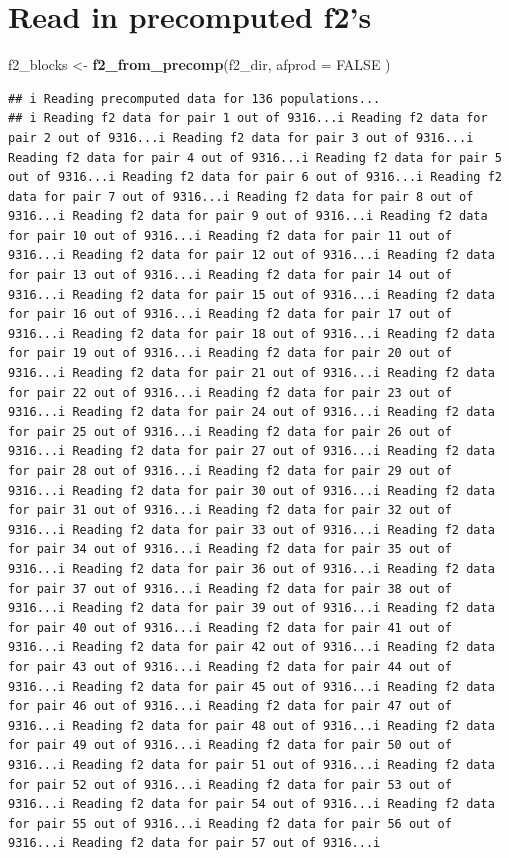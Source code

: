 \documentclass[
]{article}
\newenvironment{Shaded}{\begin{snugshade}}{\end{snugshade}}
\newcommand{\AttributeTok}[1]{\textcolor[rgb]{0.13,0.29,0.53}{#1}}
\newcommand{\ConstantTok}[1]{\textcolor[rgb]{0.56,0.35,0.01}{#1}}
\newcommand{\FunctionTok}[1]{\textcolor[rgb]{0.13,0.29,0.53}{\textbf{#1}}}
\newcommand{\NormalTok}[1]{#1}
\newcommand{\OtherTok}[1]{\textcolor[rgb]{0.56,0.35,0.01}{#1}}
\begin{document}
\section{Read in precomputed f2's}\label{read-in-precomputed-f2s}

\begin{Shaded}
\begin{Highlighting}[]
\NormalTok{f2\_blocks }\OtherTok{\textless{}{-}} \FunctionTok{f2\_from\_precomp}\NormalTok{(f2\_dir,}
  \AttributeTok{afprod =} \ConstantTok{FALSE}
\NormalTok{)}
\end{Highlighting}
\end{Shaded}

\begin{verbatim}
## i Reading precomputed data for 136 populations...
## i Reading f2 data for pair 1 out of 9316...i Reading f2 data for pair 2 out of 9316...i Reading f2 data for pair 3 out of 9316...i Reading f2 data for pair 4 out of 9316...i Reading f2 data for pair 5 out of 9316...i Reading f2 data for pair 6 out of 9316...i Reading f2 data for pair 7 out of 9316...i Reading f2 data for pair 8 out of 9316...i Reading f2 data for pair 9 out of 9316...i Reading f2 data for pair 10 out of 9316...i Reading f2 data for pair 11 out of 9316...i Reading f2 data for pair 12 out of 9316...i Reading f2 data for pair 13 out of 9316...i Reading f2 data for pair 14 out of 9316...i Reading f2 data for pair 15 out of 9316...i Reading f2 data for pair 16 out of 9316...i Reading f2 data for pair 17 out of 9316...i Reading f2 data for pair 18 out of 9316...i Reading f2 data for pair 19 out of 9316...i Reading f2 data for pair 20 out of 9316...i Reading f2 data for pair 21 out of 9316...i Reading f2 data for pair 22 out of 9316...i Reading f2 data for pair 23 out of 9316...i Reading f2 data for pair 24 out of 9316...i Reading f2 data for pair 25 out of 9316...i Reading f2 data for pair 26 out of 9316...i Reading f2 data for pair 27 out of 9316...i Reading f2 data for pair 28 out of 9316...i Reading f2 data for pair 29 out of 9316...i Reading f2 data for pair 30 out of 9316...i Reading f2 data for pair 31 out of 9316...i Reading f2 data for pair 32 out of 9316...i Reading f2 data for pair 33 out of 9316...i Reading f2 data for pair 34 out of 9316...i Reading f2 data for pair 35 out of 9316...i Reading f2 data for pair 36 out of 9316...i Reading f2 data for pair 37 out of 9316...i Reading f2 data for pair 38 out of 9316...i Reading f2 data for pair 39 out of 9316...i Reading f2 data for pair 40 out of 9316...i Reading f2 data for pair 41 out of 9316...i Reading f2 data for pair 42 out of 9316...i Reading f2 data for pair 43 out of 9316...i Reading f2 data for pair 44 out of 9316...i Reading f2 data for pair 45 out of 9316...i Reading f2 data for pair 46 out of 9316...i Reading f2 data for pair 47 out of 9316...i Reading f2 data for pair 48 out of 9316...i Reading f2 data for pair 49 out of 9316...i Reading f2 data for pair 50 out of 9316...i Reading f2 data for pair 51 out of 9316...i Reading f2 data for pair 52 out of 9316...i Reading f2 data for pair 53 out of 9316...i Reading f2 data for pair 54 out of 9316...i Reading f2 data for pair 55 out of 9316...i Reading f2 data for pair 56 out of 9316...i Reading f2 data for pair 57 out of 9316...i 
\end{verbatim}
\end{document}
